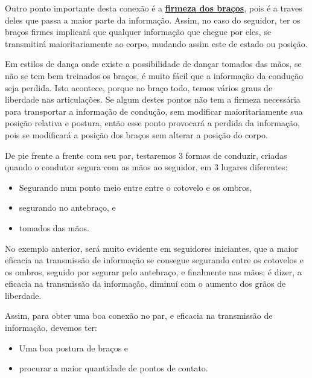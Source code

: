 \begin{description}
Outro ponto importante desta conexão é a \hyperref[def:brazosfirmes]{\textbf{firmeza dos braços}}, 
pois é a traves deles que passa a maior parte da informação.
Assim, no caso do seguidor, ter os braços firmes implicará que qualquer informação que chegue por eles,
se transmitirá maioritariamente ao corpo,
mudando assim este de estado ou posição.

Em estilos de dança onde existe a possibilidade de dançar tomados das mãos,
se não se tem bem treinados os braços,
é muito fácil que a informação da condução seja perdida.
Isto acontece, porque no braço todo, temos vários graus de liberdade nas articulações.
Se algum destes pontos não tem a firmeza necessária para transportar a informação de condução, 
sem modificar maioritariamente sua posição relativa e postura,  
então esse ponto provocará a perdida da informação, 
pois se modificará a posição dos braços sem alterar a posição do corpo.
\begin{example}
De pie frente a frente com seu par, testaremos 3 formas de conduzir, 
criadas quando o condutor segura com as mãos ao seguidor, em 3 lugares diferentes:
\begin{itemize}
\item Segurando num ponto meio entre entre o cotovelo e os ombros,
\item segurando no antebraço, e
\item tomados das mãos.
\end{itemize}
\end{example}
No exemplo anterior, será muito evidente em seguidores iniciantes,
que a maior eficacia na transmissão de informação se consegue segurando entre os cotovelos e os ombros,
seguido por segurar pelo antebraço, e finalmente nas mãos;
é dizer, a eficacia na transmissão da informação, 
diminuí com o aumento dos grãos de liberdade.

Assim, para obter uma boa conexão no par, 
e eficacia na transmissão de informação, devemos ter:
\begin{itemize}
\item Uma boa postura de braços e
\item procurar a maior quantidade de pontos de contato.
\end{itemize}  

\end{description}
